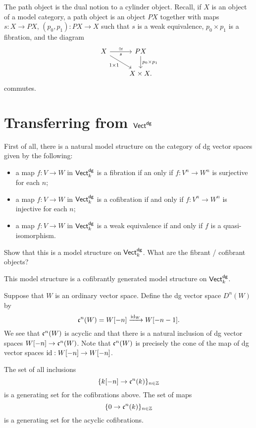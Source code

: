 \documentclass[11pt]{amsart}
\begin{document}
\begin{rmk}
The path object is the dual notion to a cylinder object.
Recall, if $X$ is an object of a model category, a path object is an object $PX$ together with maps $s : X \to PX$, $(p_0,p_1) : PX \to X$ such that $s$ is a weak equivalence, $p_0 \times p_1$ is a fibration, and the diagram
\[
\begin{tikzcd}
X \ar[r,"s"', "\simeq"]  \ar[dr, "1 \times 1"'] & P X \ar[d, "p_0 \times p_1"] \\
& X \times X .
\end{tikzcd}
\]
commutes.
\end{rmk}

\section{Transferring from ${\sf Vect}^{\sf dg}$}

First of all, there is a natural model structure on the category of dg vector spaces given by the following:
\begin{itemize}
\item a map $f : V \to W$ in ${\sf Vect}^{\sf dg}_k$ is a fibration if an only if $f : V^n \to W^n$ is surjective for each $n$;
\item a map $f : V \to W$ in ${\sf Vect}^{\sf dg}_k$ is a cofibration if and only if $f : V^n \to W^n$ is injective for each $n$;
\item a map $f : V \to W$ in ${\sf Vect}^{\sf dg}_k$ is a weak equivalence if and only if $f$ is a quasi-isomorphism. 
\end{itemize}

\begin{ex}
Show that this is a model structure on ${\sf Vect}^{\sf dg}_k$.
What are the fibrant / cofibrant objects?
\end{ex}

\begin{thm}
This model structure is a cofibrantly generated model structure on ${\sf Vect}^{\sf dg}_k$. 
\end{thm}

\begin{rmk}
Suppose that $W$ is an ordinary vector space.
Define the dg vector space $D^n(W)$ by 
\[
\mathfrak c^n (W) = W[-n] \xrightarrow{{\rm id}_W} W[-n-1] .
\]
We see that $\mathfrak c^n(W)$ is acyclic and that there is a natural inclusion of dg vector spaces $W[-n] \to \mathfrak c^n(W)$.
Note that $\mathfrak c^n(W)$ is precisely the cone of the map of dg vector spaces ${\rm id} : W[-n] \to W[-n]$. 

The set of all inclusions
\[
\{k[-n] \to \mathfrak c^n(k)\}_{n \in \mathbb Z}
\]
is a generating set for the cofibrations above. 
The set of maps
\[
\{0 \to \mathfrak c^n(k)\}_{n \in \mathbb Z}
\]
is a generating set for the acyclic cofibrations. 
\end{rmk}
\end{document}
